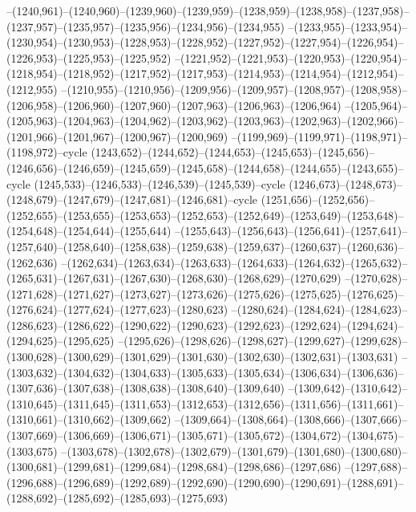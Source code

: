 --(1240,961)--(1240,960)--(1239,960)--(1239,959)--(1238,959)--(1238,958)--(1237,958)--(1237,957)--(1235,957)--(1235,956)--(1234,956)--(1234,955)
--(1233,955)--(1233,954)--(1230,954)--(1230,953)--(1228,953)--(1228,952)--(1227,952)--(1227,954)--(1226,954)--(1226,953)--(1225,953)--(1225,952)
--(1221,952)--(1221,953)--(1220,953)--(1220,954)--(1218,954)--(1218,952)--(1217,952)--(1217,953)--(1214,953)--(1214,954)--(1212,954)--(1212,955)
--(1210,955)--(1210,956)--(1209,956)--(1209,957)--(1208,957)--(1208,958)--(1206,958)--(1206,960)--(1207,960)--(1207,963)--(1206,963)--(1206,964)
--(1205,964)--(1205,963)--(1204,963)--(1204,962)--(1203,962)--(1203,963)--(1202,963)--(1202,966)--(1201,966)--(1201,967)--(1200,967)--(1200,969)
--(1199,969)--(1199,971)--(1198,971)--(1198,972)--cycle
(1243,652)--(1244,652)--(1244,653)--(1245,653)--(1245,656)--(1246,656)--(1246,659)--(1245,659)--(1245,658)--(1244,658)--(1244,655)--(1243,655)--cycle
(1245,533)--(1246,533)--(1246,539)--(1245,539)--cycle
(1246,673)--(1248,673)--(1248,679)--(1247,679)--(1247,681)--(1246,681)--cycle
(1251,656)--(1252,656)--(1252,655)--(1253,655)--(1253,653)--(1252,653)--(1252,649)--(1253,649)--(1253,648)--(1254,648)--(1254,644)--(1255,644)
--(1255,643)--(1256,643)--(1256,641)--(1257,641)--(1257,640)--(1258,640)--(1258,638)--(1259,638)--(1259,637)--(1260,637)--(1260,636)--(1262,636)
--(1262,634)--(1263,634)--(1263,633)--(1264,633)--(1264,632)--(1265,632)--(1265,631)--(1267,631)--(1267,630)--(1268,630)--(1268,629)--(1270,629)
--(1270,628)--(1271,628)--(1271,627)--(1273,627)--(1273,626)--(1275,626)--(1275,625)--(1276,625)--(1276,624)--(1277,624)--(1277,623)--(1280,623)
--(1280,624)--(1284,624)--(1284,623)--(1286,623)--(1286,622)--(1290,622)--(1290,623)--(1292,623)--(1292,624)--(1294,624)--(1294,625)--(1295,625)
--(1295,626)--(1298,626)--(1298,627)--(1299,627)--(1299,628)--(1300,628)--(1300,629)--(1301,629)--(1301,630)--(1302,630)--(1302,631)--(1303,631)
--(1303,632)--(1304,632)--(1304,633)--(1305,633)--(1305,634)--(1306,634)--(1306,636)--(1307,636)--(1307,638)--(1308,638)--(1308,640)--(1309,640)
--(1309,642)--(1310,642)--(1310,645)--(1311,645)--(1311,653)--(1312,653)--(1312,656)--(1311,656)--(1311,661)--(1310,661)--(1310,662)--(1309,662)
--(1309,664)--(1308,664)--(1308,666)--(1307,666)--(1307,669)--(1306,669)--(1306,671)--(1305,671)--(1305,672)--(1304,672)--(1304,675)--(1303,675)
--(1303,678)--(1302,678)--(1302,679)--(1301,679)--(1301,680)--(1300,680)--(1300,681)--(1299,681)--(1299,684)--(1298,684)--(1298,686)--(1297,686)
--(1297,688)--(1296,688)--(1296,689)--(1292,689)--(1292,690)--(1290,690)--(1290,691)--(1288,691)--(1288,692)--(1285,692)--(1285,693)--(1275,693)
